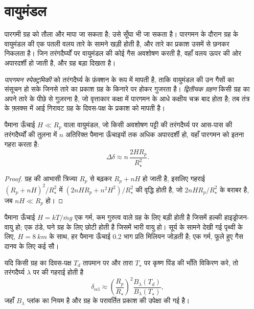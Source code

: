 \section{वायुमंडल}\label{sec:b3:exoplanets:atmospheres}

पारगमी ग्रह को तौला और मापा जा सकता है; उसे सूँघा भी जा सकता है।
पारगमन के दौरान ग्रह के वायुमंडल की एक पतली वलय तारे के सामने खड़ी होती है,
और तारे का प्रकाश उसमें से छनकर निकलता है। जिन तरंगदैर्घ्यों पर वायुमंडल की कोई गैस
अवशोषण करती है, वहाँ वलय ऊपर की ओर अपारदर्शी हो जाती है,
और ग्रह बड़ा दिखता है।

\begin{definition}\label{def:b3:exoplanets:transmission}
\emph{पारगमन स्पेक्ट्रमिकी}  को
तरंगदैर्घ्य के फ़ंक्शन के रूप में मापती है, ताकि
वायुमंडल की उन गैसों का संसूचन हो सके जिनसे तारे का प्रकाश ग्रह के किनारे पर होकर गुजरता है।
\emph{द्वितीयक ग्रहण} किसी ग्रह का अपने तारे के पीछे से गुज़रना है, जो
वृत्ताकार कक्षा में पारगमन के आधे कक्षीय चक्र बाद होता है;
तब तंत्र के फ़्लक्स में आई गिरावट
ग्रह के दिवस-पक्ष के प्रकाश को मापती है।
\end{definition}

\begin{proposition}[पारगमन संकेत]\label{prop:b3:exoplanets:transmission}
पैमाना ऊँचाई $H \ll R_p$ वाला वायुमंडल, जो किसी अवशोषण पट्टी की तरंगदैर्घ्य पर
आस-पास की तरंगदैर्घ्यों की तुलना में $n$ अतिरिक्त पैमाना ऊँचाइयों तक अधिक अपारदर्शी हो,
वहाँ पारगमन को इतना गहरा करता है:
\[
\Delta\delta \approx n\,\frac{2HR_p}{R_\star^2} .
\]
\end{proposition}

\begin{proof}
ग्रह की आभासी त्रिज्या $R_p$ से बढ़कर $R_p + nH$ हो जाती है, इसलिए
गहराई $(R_p + nH)^2/R_\star^2$ में $(2nHR_p + n^2H^2)/R_\star^2$ की वृद्धि होती है,
जो $2nHR_p/R_\star^2$ के बराबर है, जब $nH \ll R_p$ हो।
\end{proof}

पैमाना ऊँचाई $H = kT/\bar m g$ एक गर्म, कम गुरुत्व वाले ग्रह के लिए बड़ी होती है जिसमें
हल्की हाइड्रोजन-वायु हो; एक ठंडे, घने ग्रह के लिए छोटी होती है जिसमें भारी वायु हो।
सूर्य के सामने देखी गई पृथ्वी के लिए, $H = \qty{8}{km}$ के साथ,
हर पैमाना ऊँचाई 0.2 भाग प्रति मिलियन जोड़ती है; एक गर्म, फूले हुए गैस दानव के लिए
कई सौ।

\begin{proposition}\label{prop:b3:exoplanets:eclipse}
यदि किसी ग्रह का दिवस-पक्ष $T_d$ तापमान पर और तारा $T_\star$ पर
कृष्ण पिंड की भाँति विकिरण करे,
तो तरंगदैर्घ्य $\lambda$ पर  की गहराई होती है
\[
\delta_\mathrm{ecl} \approx \left(\frac{R_p}{R_\star}\right)^2
  \frac{B_\lambda(T_d)}{B_\lambda(T_\star)},
\]
जहाँ $B_\lambda$ प्लांक का नियम है और ग्रह के परावर्तित प्रकाश की उपेक्षा की गई है।
\end{proposition}

